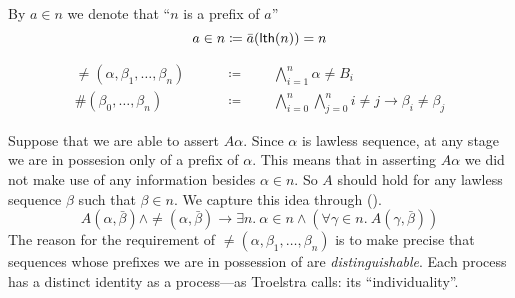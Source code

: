 \documentclass[11pt]{article}
\begin{document}
\begin{notation}
  By $a \in n$ we denote that ``$n$ is a prefix of $a$''
  \[ a \in n \coloneqq \bar{a}(\mathsf{lth}(n)) = n \]
\end{notation}

\begin{notation}
  \begin{align*}
  \neq(\alpha, \beta_1, \dots, \beta_n) \qquad &\coloneqq \qquad
    \bigwedge_{i=1}^{n} \alpha \neq B_i\\
  \#(\beta_0, \dots, \beta_n) \qquad &\coloneqq \qquad
    \bigwedge_{i=0}^n \bigwedge_{j=0}^n i \neq j \rightarrow \beta_i \neq \beta_j
  \end{align*}
\end{notation}

Suppose that we are able to assert $A\alpha$. Since $\alpha$ is lawless
sequence, at any stage we are in possesion only of a prefix of $\alpha$. This
means that in asserting $A\alpha$ we did not make use of any information
besides  $\alpha \in n$. So $A$ should hold for any lawless sequence $\beta$
such that $\beta \in n$. We capture this idea through (\LSIII).
\begin{equation}\label{LS3}
  A(\alpha, \bar{\beta}) \land \neq(\alpha, \bar{\beta})
  \rightarrow \exists n.\ \alpha \in n \land
  (\forall \gamma \in n.\ A(\gamma, \bar{\beta}))
  \tag{\LSIII}
\end{equation}
The reason for the requirement of $\neq(\alpha, \beta_1, \dots, \beta_n)$ is
to make precise that sequences whose prefixes we are in possession of are
\emph{distinguishable}. Each process has a distinct identity as a process---as
Troelstra \cite[pg. 11]{troelstra-choice-sequence} calls: its ``individuality''.



\end{document}
